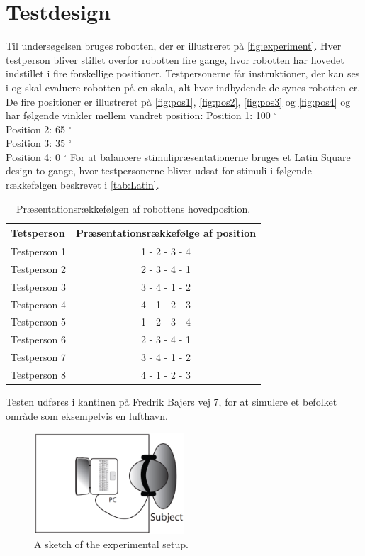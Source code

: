 \section*{Testdesign}
%
Til undersøgelsen bruges robotten, der er illustreret på \autoref{fig:experiment}. Hver testperson bliver stillet overfor robotten fire gange, hvor robotten har hovedet indstillet i fire forskellige positioner. Testpersonerne får instruktioner, der kan ses i  og skal evaluere robotten på en skala, alt hvor indbydende de synes robotten er. De fire positioner er illustreret på \autoref{fig:pos1}, \autoref{fig:pos2}, \autoref{fig:pos3} og \autoref{fig:pos4} og har følgende vinkler mellem vandret position:\blankline
%
Position 1: 100 $^{\circ}$\\
Position 2: 65 $^{\circ}$\\
Position 3: 35 $^{\circ}$\\
Position 4: 0 $^{\circ}$\blankline
%
For at balancere stimulipræsentationerne bruges et Latin Square design to gange, hvor testpersonerne bliver udsat for stimuli i følgende rækkefølgen beskrevet i \autoref{tab:Latin}.\blankline
%
\begin{table}[H]
	\centering
	\begin{tabular}{l|c}
		Tetsperson     & Præsentationsrækkefølge af position \\\hline
		Testperson 1   & 1 - 2 - 3 - 4          \\\hline
		Testperson 2   & 2 - 3 - 4 - 1          \\\hline
		Testperson 3   & 3 - 4 - 1 - 2          \\\hline
		Testperson 4   & 4 - 1 - 2 - 3          \\\hline
		Testperson 5   & 1 - 2 - 3 - 4          \\\hline
		Testperson 6   & 2 - 3 - 4 - 1          \\\hline
		Testperson 7   & 3 - 4 - 1 - 2          \\\hline
		Testperson 8   & 4 - 1 - 2 - 3   
	\end{tabular}
	\caption{Præsentationsrækkefølgen af robottens hovedposition.}
	\label{tab:Latin}         
\end{table}
\noindent
%
Testen udføres i kantinen på Fredrik Bajers vej 7, for at simulere et befolket område som eksempelvis en lufthavn. 



%
\begin{figure}[H]
\centering
\includegraphics[width = 0.5\textwidth]{Figure/experiment.png} 
\caption{A sketch of the experimental setup.}
\label{fig:experiment}
\end{figure}
%
